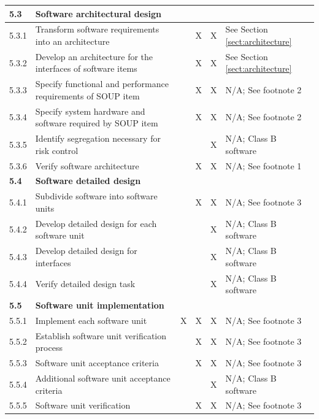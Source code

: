 \documentclass[]{article}
\begin{document}
\begin{center}
\begin{longtable}{ |p{1.3cm}| p{5.5cm}| p{0.7cm}| p{0.7cm}| p{0.7cm}| p{3.5cm}| }
	
	\rowcolor{blue!25} \textbf{5.3} & \textbf{Software architectural design} &  &  &  &  \\ \hline
	5.3.1 & Transform software requirements into an architecture &  & X & X & See Section \ref{sect:architecture} \\ \hline
	5.3.2 & Develop an architecture for the interfaces of software items &   & X & X & See Section \ref{sect:architecture} \\ \hline
	5.3.3 & Specify functional and performance requirements of SOUP item &   & X & X & N/A; See footnote 2  \\ \hline
	5.3.4 & Specify system hardware and software required by SOUP item  &  & X & X & N/A; See footnote 2 \\ \hline
	5.3.5 & Identify segregation necessary for risk control &  &  & X & N/A; Class B software  \\ \hline
	5.3.6 & Verify software architecture &  & X & X & N/A; See footnote 1 \\ \hline
	
	
	\rowcolor{blue!25} \textbf{5.4} & \textbf{Software detailed design} &  &  &  &  \\ \hline
	5.4.1 & Subdivide software into software units &  & X & X & N/A; See footnote 3  \\ \hline
	5.4.2 & Develop detailed design for each software unit &  &  & X & N/A; Class B software  \\ \hline
	5.4.3 & Develop detailed design for interfaces &  &  & X & N/A; Class B software  \\ \hline
	5.4.4 & Verify detailed design task &  &   & X & N/A; Class B software  \\ \hline
	
	
	\rowcolor{blue!25} \textbf{5.5} & \textbf{Software unit implementation} &  &  &  &  \\ \hline
	5.5.1 & Implement each software unit & X & X & X & N/A; See footnote 3 \\ \hline
	5.5.2 & Establish software unit verification process &  & X & X & N/A; See footnote 3 \\ \hline
	5.5.3 & Software unit acceptance criteria &  & X & X & N/A; See footnote 3 \\ \hline
	5.5.4 & Additional software unit  acceptance criteria &  &  & X &  N/A; Class B software \\ \hline
	5.5.5 & Software unit verification &  & X & X & N/A; See footnote 3 \\ \hline
	

\end{longtable}
\end{center}
\end{document}
